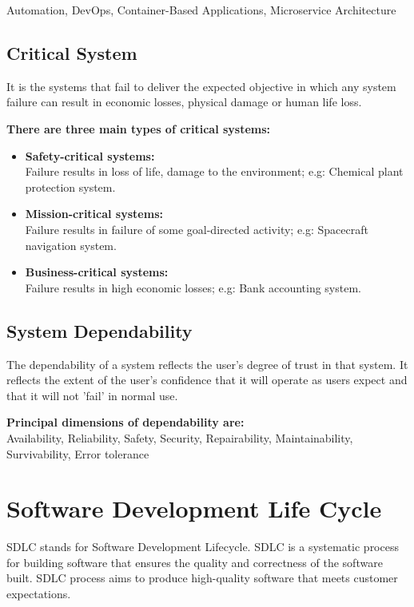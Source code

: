 Automation, DevOps, Container-Based Applications, Microservice Architecture

\subsection{Critical System}

It is the systems that fail to deliver the expected objective in which any system failure can result in economic losses, physical damage or human life loss.

\textbf{There are three main types of critical systems:}
\begin{itemize}[parsep=1ex]
   \item \textbf{Safety-critical systems:}\\
   Failure results in loss of life, damage to the environment;
   e.g: Chemical plant protection system.

   \item \textbf{Mission-critical systems:}\\
   Failure results in failure of some goal-directed activity;
   e.g: Spacecraft navigation system.

   \item \textbf{Business-critical systems:}\\
   Failure results in high economic losses;
   e.g: Bank accounting system.
\end{itemize}


\subsection{System Dependability}
The dependability of a system reflects the user's degree of trust in
that system. It reflects the extent of the user's confidence that it
will operate as users expect and that it will not 'fail' in normal use.

\textbf{Principal dimensions of dependability are:}\\[1ex]
Availability, 
Reliability, 
Safety, 
Security, 
Repairability, 
Maintainability, 
Survivability, 
Error tolerance


\section{Software Development Life Cycle}

SDLC stands for Software Development Lifecycle. SDLC is a systematic process for building software that ensures the quality and correctness of the software built. SDLC process aims to produce high-quality software that meets customer expectations.

